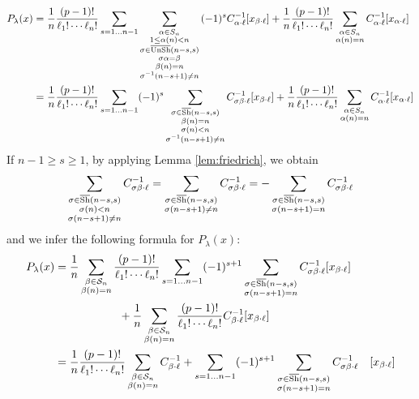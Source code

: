 \documentclass[12pt]{article}
\begin{document}
\begin{align*}
P_{\lambda}(x) &= \frac{1}{n} \frac{(p-1)!}{\ell_1!\cdots \ell_n!} \sum_{s=1\ldots n-1}\sum_{\substack{\alpha \in S_n\\ 1\leq \alpha(n)<n\\ \sigma \in \overline{\rm UnSh}{(n-s,s)} \\ \sigma \alpha = \beta \\ \beta(n)=n \\ \sigma^{-1}(n-s+1)\neq n }} {(-1)^{s}}{C^{-1}_{\alpha\cdot\ell}}[ x_{\beta \cdot\ell}]
+\frac{1}{n} \frac{(p-1)!}{\ell_1!\cdots \ell_n!}\sum_{\substack{\alpha \in S_n \\  \alpha(n)=n}} C^{-1}_{\alpha\cdot\ell}[x_{\alpha\cdot\ell}] \\
&=\frac{1}{n}\frac{(p-1)!}{\ell_{1}!\cdots \ell_{n}!}\sum_{s=1\ldots n-1}(-1)^s\sum_{\substack{\sigma \in \overline{\rm Sh}(n-s,s)\\ \beta(n)=n\\  \sigma(n)<n \\ \sigma^{-1}(n-s+1)\neq n}} {C^{-1}_{\sigma\beta \cdot \ell}}[ x_{\beta \cdot\ell} ] +\frac{1}{n} \frac{(p-1)!}{\ell_1!\cdots \ell_n!}\sum_{\substack{\alpha \in S_n \\  \alpha(n)=n}} C^{-1}_{\alpha\cdot\ell}[x_{\alpha\cdot\ell}]
\end{align*}
If $ n-1 \geq s \geq 1$, by applying Lemma \ref{lem:friedrich}, we obtain 
\begin{align*}
\sum_{\substack{\sigma \in \overline{\rm Sh}(n-s,s)\\ \sigma(n)<n \\ \sigma(n-s+1)\neq n}} {C^{-1}_{\sigma\beta \cdot \ell}} = \sum_{\substack{\sigma \in \overline{\rm Sh}(n-s,s)\\ \sigma(n-s+1)\neq n}} {C^{-1}_{\sigma\beta \cdot \ell}} = - \sum_{\substack{\sigma \in \overline{\rm Sh}(n-s,s)\\ \sigma(n-s+1)=n}} {C^{-1}_{\sigma\beta \cdot \ell}}
\end{align*}
and we infer the following formula for $P_{\lambda}(x)$:
\begin{align*}
P_{\lambda}(x) &= \frac{1}{n} \sum_{\substack{\beta \in \mathcal{S}_{n}\\ \beta(n)=n}} \frac{(p-1)!}{\ell_1!\cdots \ell_n!}\sum_{s=1\ldots n-1} (-1)^{s+1}\sum_{\substack{\sigma \in \overline{\rm Sh}(n-s,s)\\ \sigma(n-s+1)=n}} C^{-1}_{\sigma\beta\cdot\ell} [x_{\beta\cdot\ell}] \\
&\hspace{2cm}+ \frac{1}{n} \sum_{\substack{\beta \in \mathcal{S}_{n}\\ \beta(n)=n}} \frac{(p-1)!}{\ell_1!\cdots \ell_n!}C^{-1}_{\beta\cdot\ell}[x_{\beta\cdot\ell}] \\
&= \frac{1}{n}\frac{(p-1)!}{\ell_1!\cdots \ell_n!} \sum_{\substack{\beta \in \mathcal{S}_{n}\\ \beta(n)=n}} C^{-1}_{\beta\cdot\ell}+\sum_{s=1\ldots n-1} (-1)^{s+1}\sum_{\substack{\sigma \in \overline{\rm Sh}(n-s,s)\\ \sigma(n-s+1)=n}} C^{-1}_{\sigma\beta\cdot\ell} \quad [x_{\beta\cdot\ell}]
\end{align*}
\end{document}

